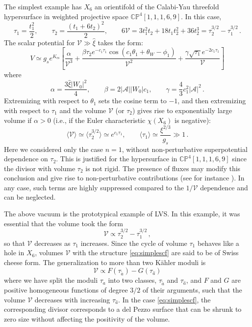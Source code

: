 \documentclass[12pt,a4wide]{article}
\def\xih{{\hat \xi}}
\def\V{\mathcal{V}}
\def\be{\begin{equation}}
\def\ee{\end{equation}}
\begin{document}
\begin{itemize}
The simplest example has $X_6$ an orientifold of the Calabi-Yau threefold hypersurface in weighted projective space   $\mathbb{C}{\mathbb P}^4[{1,1,1,6,9}]$. In this case,
\be
\tau_1=\frac{t_1^2}{2}, \qquad \tau_2=\frac{\left(t_1+6t_2\right)^2}{2}, \qquad 6\V=3t_1^2 t_2+18t_1t_2^2+36t_2^3=\tau_2^{3/2}-\tau_1^{3/2}\,.
\ee
The scalar potential for $\V\gg \xih$ takes the form:
\be
V\simeq g_se^{K_{\text{cs}}}\left[\frac{\alpha}{\V^3}+\frac{\beta \tau_2 e^{-c_1\tau_1}\cos\left(c_1\theta_1+\theta_W-\phi_1\right)}{\V^2}+\frac{\gamma \sqrt{\tau_1}e^{-2c_1\tau_1}}{\V}\right]
\ee
where
\be
\alpha=\frac{3\xih \left | W_0\right |^2}{4}, \qquad \beta= 2 |\mathcal{A}| \left | W_0 \right | c_1, \qquad \gamma= \frac{4}{3}c_1^2 |\mathcal{A}|^2\,.
\ee
Extremizing with respect to $\theta_1$ sets the cosine term to $-1$, and then extremizing with respect to $\tau_1$ and the volume $\V$ (or $\tau_2$) gives rise to exponentially large volume if $\alpha>0$ (i.e., if the Euler characteristic $\chi(X_6)$ is negative):
\be
\langle \V\rangle \simeq\langle \tau_2^{3/2}\rangle \simeq  e^{c_1\tau_1}, \qquad \langle \tau_1\rangle \simeq \frac{\xi^{2/3}}{g_s}\gg 1\,.
\ee
Here we considered only the case $n=1$, without non-perturbative superpotential dependence on $\tau_2$. This is justified for the hypersurface in $\mathbb{C}{\mathbb P}^4[{1,1,1,6,9}]$ since the divisor with volume $\tau_2$ is not rigid. The presence of fluxes may modify this conclusion and give rise to non-perturbative contributions (see for instance \cite{Louis:2012nb}). In any case, such terms are highly suppressed compared to the $1/\V$ dependence and can be neglected. 

The above vacuum is the prototypical example of LVS. 
In this example, it was essential that the volume took the form
\begin{equation}\label{eq:simplescf}
\V\propto \tau_2^{3/2}-\tau_1^{3/2}\,,
\end{equation}
so that $\V$ decreases as $\tau_1$ increases.
Since the cycle of volume $\tau_1$ behaves like a hole in $X_6$, volumes $\V$ with the structure \eqref{eq:simplescf} are said to be of Swiss cheese form.
The generalization to more than two K\"ahler moduli is
\be \label{eq:scf}
\V\propto F(\tau_{\tilde a})-G(\tau_{\hat a})
\ee
where we have split the moduli $\tau_a$ into two classes, $\tau_{\tilde a}$ and $\tau_{\hat a}$, and $F$ and $G$ are positive homogeneous functions of degree $3/2$ of their arguments, such that the volume $\V$ decreases with increasing $\tau_{\hat a}$.
In the case \eqref{eq:simplescf}, 
the corresponding divisor corresponds to a del Pezzo surface that can be shrunk to zero size without affecting the positivity of the volume. 


\end{itemize}
\end{document}
